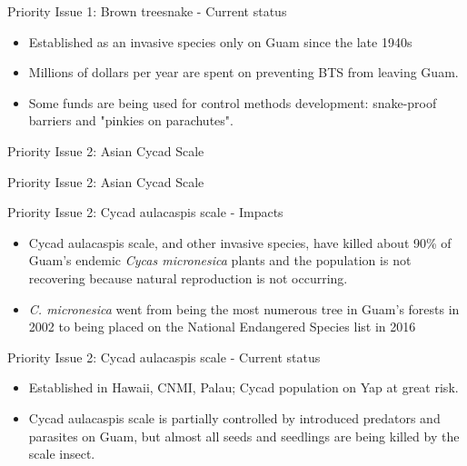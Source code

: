 \documentclass[]{beamer}
\begin{document}
\begin{frame}{Priority Issue 1: Brown treesnake - Current status}
\begin{itemize}
	\item Established as an invasive species only on Guam since the late 1940s
	\item Millions of dollars per year are spent on preventing BTS from leaving Guam.
	\item Some funds are being used for control methods development: snake-proof barriers and "pinkies on parachutes".
\end{itemize}	
\end{frame}

\begin{frame}{Priority Issue 2: Asian Cycad Scale}
\end{frame}

\begin{frame}{Priority Issue 2: Asian Cycad Scale}
\end{frame}

\begin{frame}{Priority Issue 2: Cycad aulacaspis scale - Impacts}
	\begin{itemize}
		\item Cycad aulacaspis scale, and other invasive species, have killed about 90\% of Guam's endemic \textit{Cycas micronesica} plants and the population is not recovering because natural reproduction is not occurring.
		\item{\textit{C. micronesica} went from being the most numerous tree in Guam's forests in 2002 to being placed on the National Endangered Species list in 2016}
	\end{itemize}
\end{frame}

\begin{frame}{Priority Issue 2: Cycad aulacaspis scale - Current status}
\begin{itemize}
	\item Established in Hawaii, CNMI, Palau; Cycad population on Yap at great risk.
	\item Cycad aulacaspis scale is partially controlled by introduced predators and parasites on Guam, but almost all seeds and seedlings are being killed by the scale insect.
\end{itemize}	
\end{frame}
\end{document}
